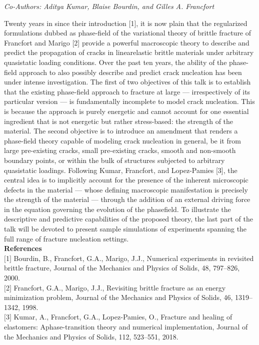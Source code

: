 \begin{center}
\textit{Co-Authors: Aditya Kumar, Blaise Bourdin, and Gilles A. Francfort}
\end{center} 
Twenty years in since their introduction [1], it is now plain that the regularized formulations dubbed as phase-field of the variational theory of brittle fracture of Francfort and Marigo [2] provide a powerful macroscopic theory to describe and predict the propagation of cracks in linearelastic brittle materials under arbitrary quasistatic loading conditions. Over the past ten years, the ability of the phase-field approach to also possibly describe and predict crack nucleation has been under intense investigation. The first of two objectives of this talk is to establish that the existing phase-field approach to fracture at large — irrespectively of its particular version — is fundamentally incomplete to model crack nucleation. This is because the approach is purely energetic and cannot account for one essential ingredient that is not energetic but rather stress-based: the strength of the material.  The second objective is to introduce an amendment that renders a phase-field theory capable of modeling crack nucleation in general, be it from large pre-existing cracks, small pre-existing cracks, smooth and non-smooth boundary points, or within the bulk of structures subjected to arbitrary quasistatic loadings. Following Kumar, Francfort, and Lopez-Pamies [3], the central idea is to implicitly account for the presence of the inherent microscopic defects in the material — whose defining macroscopic manifestation is precisely the strength of the material — through the addition of an external driving force in the equation governing the evolution of the phasefield. To illustrate the descriptive and predictive capabilities of the proposed theory, the last part of the talk will be devoted to present sample simulations of experiments spanning the full range of fracture nucleation settings.\\

\noindent\textbf{References}\\
$[$1$]$ Bourdin, B., Francfort, G.A., Marigo, J.J., Numerical experiments in revisited brittle fracture, Journal of the Mechanics and Physics of Solids, 48, 797–826, 2000.\\\newline
$[$2$]$ Francfort, G.A., Marigo, J.J., Revisiting brittle fracture as an energy minimization problem, Journal of the Mechanics and Physics of Solids, 46, 1319–1342, 1998.\\\newline
$[$3$]$ Kumar, A., Francfort, G.A., Lopez-Pamies, O., Fracture and healing of elastomers: Aphase-transition theory and numerical implementation, Journal of the Mechanics and Physics of Solids, 112, 523–551, 2018.



